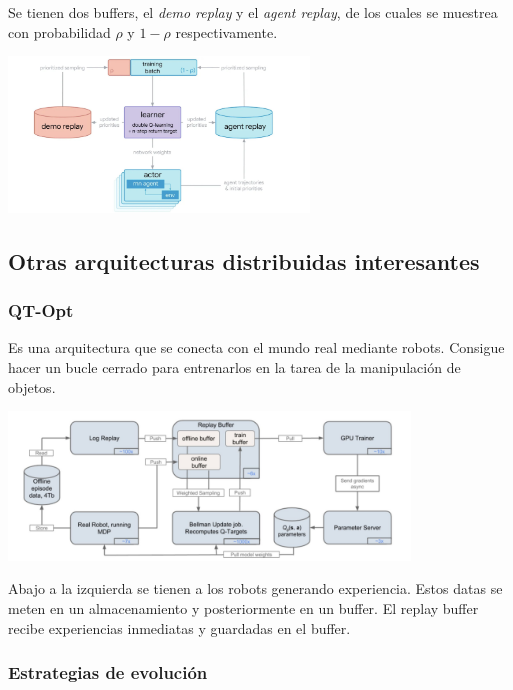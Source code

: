 \begin{itemize}
        Se tienen dos buffers, el \textit{demo replay} y el \textit{agent replay}, de los
        cuales se muestrea con probabilidad $\rho$ y $1-\rho$ respectivamente.
\begin{center}
\includegraphics[width=0.6\textwidth]{figures/2020-07-13-150637_948x491_scrot.png}
\end{center}
\end{itemize}

\subsection{Otras arquitecturas distribuidas interesantes}%
\label{sub:otras_arquitecturas_distribuidas_interesantes}

\subsubsection{QT-Opt}%
\label{ssub:qt_opt}

Es una arquitectura que se conecta con el mundo real mediante robots. Consigue hacer un
bucle cerrado para entrenarlos en la tarea de la manipulación de objetos. 

\begin{center}
\includegraphics[width=0.8\textwidth]{figures/2020-07-13-172142_1095x407_scrot.png}
\end{center}

Abajo a la izquierda se tienen a los robots generando experiencia. Estos datas se meten en un
almacenamiento y posteriormente en un buffer. El replay buffer recibe experiencias
inmediatas y guardadas en el buffer.

\subsubsection{Estrategias de evolución}%
\label{ssub:estrategias_de_evolución}

